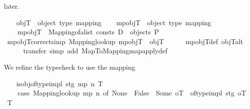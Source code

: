 \begin{isabellebody}
\begin{isamarkuptext}
    later.%
\end{isamarkuptext}\isamarkuptrue%
\ \ \isamarkupfalse%
\ objT\ {\isacharequal}{\kern0pt}\ {\isachardoublequoteopen}{\isacharparenleft}{\kern0pt}object{\isacharcomma}{\kern0pt}\ type{\isacharparenright}{\kern0pt}\ mapping{\isachardoublequoteclose}\isanewline
\isanewline
\ \ \isamarkupfalse%
\ mp{\isacharunderscore}{\kern0pt}objT\ {\isacharcolon}{\kern0pt}{\isacharcolon}{\kern0pt}\ {\isachardoublequoteopen}{\isacharparenleft}{\kern0pt}object{\isacharcomma}{\kern0pt}\ type{\isacharparenright}{\kern0pt}\ mapping{\isachardoublequoteclose}\ \isanewline
\ \ \ \ {\isachardoublequoteopen}mp{\isacharunderscore}{\kern0pt}objT\ {\isacharequal}{\kern0pt}\ Mapping{\isachardot}{\kern0pt}of{\isacharunderscore}{\kern0pt}alist\ {\isacharparenleft}{\kern0pt}consts\ D\ {\isacharat}{\kern0pt}\ objects\ P{\isacharparenright}{\kern0pt}{\isachardoublequoteclose}\isanewline
\isanewline
\ \ \isamarkupfalse%
\ mp{\isacharunderscore}{\kern0pt}objT{\isacharunderscore}{\kern0pt}correct{\isacharbrackleft}{\kern0pt}simp{\isacharbrackright}{\kern0pt}{\isacharcolon}{\kern0pt}\ {\isachardoublequoteopen}Mapping{\isachardot}{\kern0pt}lookup\ mp{\isacharunderscore}{\kern0pt}objT\ {\isacharequal}{\kern0pt}\ objT{\isachardoublequoteclose}\isanewline
%
\isadelimproof
\ \ \ \ %
\endisadelimproof
%
\isatagproof
{}\isamarkupfalse%
\ mp{\isacharunderscore}{\kern0pt}objT{\isacharunderscore}{\kern0pt}def\ objT{\isacharunderscore}{\kern0pt}alt\isanewline
\ \ \ \ \isamarkupfalse%
\ transfer\ {\isacharparenleft}{\kern0pt}simp\ add{\isacharcolon}{\kern0pt}\ Map{\isacharunderscore}{\kern0pt}To{\isacharunderscore}{\kern0pt}Mapping{\isachardot}{\kern0pt}map{\isacharunderscore}{\kern0pt}apply{\isacharunderscore}{\kern0pt}def{\isacharparenright}{\kern0pt}%
\endisatagproof
{\isafoldproof}%
%
\isadelimproof
%
\endisadelimproof
%
\begin{isamarkuptext}%
We refine the typecheck to use the mapping%
\end{isamarkuptext}\isamarkuptrue%
\ \ \isamarkupfalse%
\ {\isachardoublequoteopen}is{\isacharunderscore}{\kern0pt}obj{\isacharunderscore}{\kern0pt}of{\isacharunderscore}{\kern0pt}type{\isacharunderscore}{\kern0pt}impl\ stg\ mp\ n\ T\ {\isacharequal}{\kern0pt}\ {\isacharparenleft}{\kern0pt}\isanewline
\ \ \ \ case\ Mapping{\isachardot}{\kern0pt}lookup\ mp\ n\ of\ None\ {\isasymRightarrow}\ False\ {\isacharbar}{\kern0pt}\ Some\ oT\ {\isasymRightarrow}\ of{\isacharunderscore}{\kern0pt}type{\isacharunderscore}{\kern0pt}impl\ stg\ oT\ T\isanewline

\end{isabellebody}
